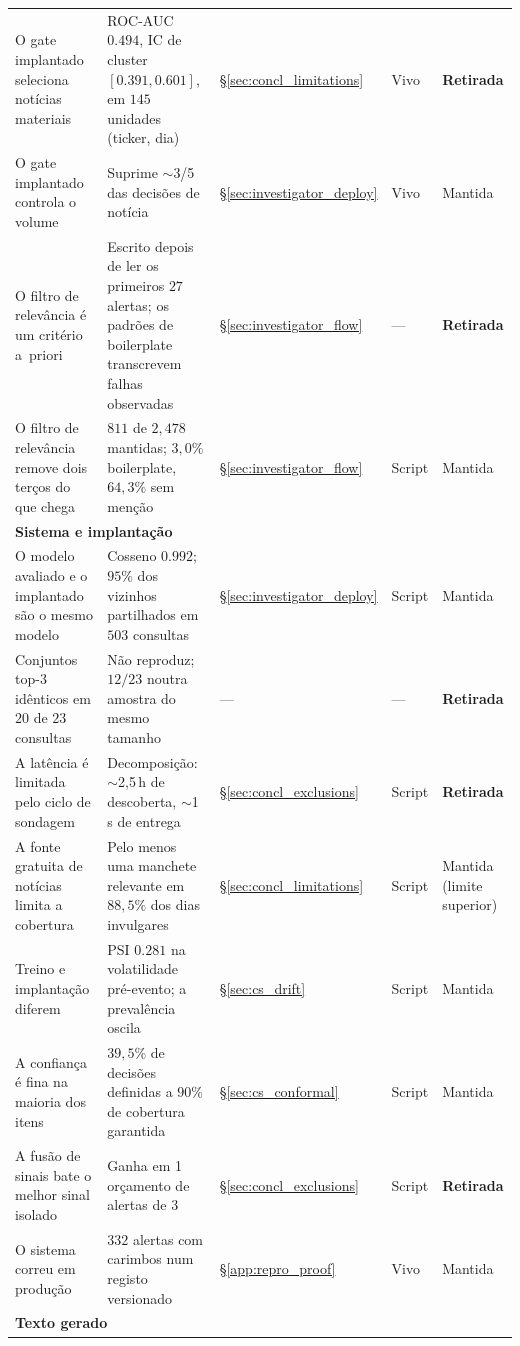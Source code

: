 \begin{table}[ht]
\begin{tabular}{p{4.6cm} p{3.5cm} p{1.6cm} p{1.2cm} p{1.7cm}}
O gate implantado seleciona notícias materiais & ROC-AUC $0.494$, IC de cluster $[0.391, 0.601]$, em $145$ unidades (ticker, dia) & §\ref{sec:concl_limitations} & Vivo & \textbf{Retirada} \\
O gate implantado controla o volume & Suprime $\sim$3/5 das decisões de notícia & §\ref{sec:investigator_deploy} & Vivo & Mantida \\
\midrule
O filtro de relevância é um critério a~priori & Escrito depois de ler os primeiros $27$ alertas; os padrões de boilerplate transcrevem falhas observadas & §\ref{sec:investigator_flow} & --- & \textbf{Retirada} \\
O filtro de relevância remove dois terços do que chega & $811$ de $2{,}478$ mantidas; $3,0\%$ boilerplate, $64,3\%$ sem menção & §\ref{sec:investigator_flow} & Script & Mantida \\
\midrule
\multicolumn{5}{l}{\textbf{Sistema e implantação}} \\
O modelo avaliado e o implantado são o mesmo modelo & Cosseno $0.992$; $95\%$ dos vizinhos partilhados em $503$ consultas & §\ref{sec:investigator_deploy} & Script & Mantida \\
Conjuntos top-3 idênticos em $20$ de $23$ consultas & Não reproduz; $12/23$ noutra amostra do mesmo tamanho & --- & --- & \textbf{Retirada} \\
A latência é limitada pelo ciclo de sondagem & Decomposição: $\sim$2,5\,h de descoberta, $\sim$1\,s de entrega & §\ref{sec:concl_exclusions} & Script & \textbf{Retirada} \\
A fonte gratuita de notícias limita a cobertura & Pelo menos uma manchete relevante em $88,5\%$ dos dias invulgares & §\ref{sec:concl_limitations} & Script & Mantida (limite superior) \\
Treino e implantação diferem & PSI $0.281$ na volatilidade pré-evento; a prevalência oscila & §\ref{sec:cs_drift} & Script & Mantida \\
A confiança é fina na maioria dos itens & $39,5\%$ de decisões definidas a $90\%$ de cobertura garantida & §\ref{sec:cs_conformal} & Script & Mantida \\
A fusão de sinais bate o melhor sinal isolado & Ganha em 1 orçamento de alertas de 3 & §\ref{sec:concl_exclusions} & Script & \textbf{Retirada} \\
O sistema correu em produção & $332$ alertas com carimbos num registo versionado & §\ref{app:repro_proof} & Vivo & Mantida \\
\midrule
\multicolumn{5}{l}{\textbf{Texto gerado}} \\

\end{tabular}
\end{table}
